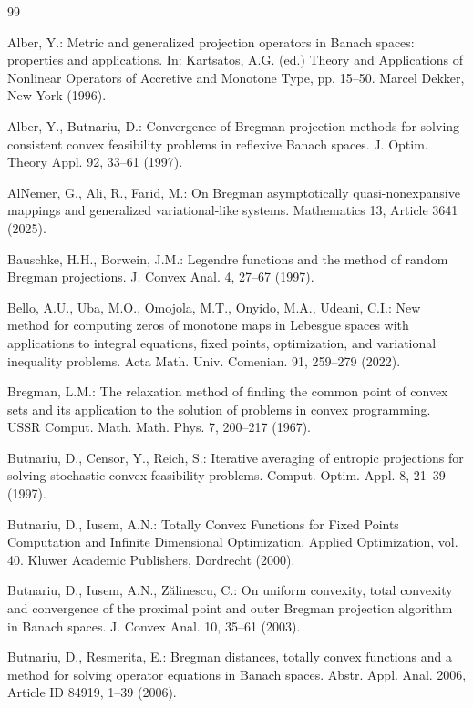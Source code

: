 \documentclass[leqno,12pt]{amsart}
\theoremstyle{definition}
\theoremstyle{remark}
\numberwithin{equation}{section}
\begin{document}
\begin{thebibliography}{99}

Alber, Y.: Metric and generalized projection operators in Banach spaces: properties and applications. In: Kartsatos, A.G. (ed.) Theory and Applications of Nonlinear Operators of Accretive and Monotone Type, pp. 15--50. Marcel Dekker, New York (1996).

Alber, Y., Butnariu, D.: Convergence of Bregman projection methods for solving consistent convex feasibility problems in reflexive Banach spaces. J. Optim. Theory Appl. 92, 33--61 (1997).

AlNemer, G., Ali, R., Farid, M.: On Bregman asymptotically quasi-nonexpansive mappings and generalized variational-like systems. Mathematics 13, Article 3641 (2025).

Bauschke, H.H., Borwein, J.M.: Legendre functions and the method of random Bregman projections. J. Convex Anal. 4, 27--67 (1997).

Bello, A.U., Uba, M.O., Omojola, M.T., Onyido, M.A., Udeani, C.I.: New method for computing zeros of monotone maps in Lebesgue spaces with applications to integral equations, fixed points, optimization, and variational inequality problems. Acta Math. Univ. Comenian. 91, 259--279 (2022).

Bregman, L.M.: The relaxation method of finding the common point of convex sets and its application to the solution of problems in convex programming. USSR Comput. Math. Math. Phys. 7, 200--217 (1967).

Butnariu, D., Censor, Y., Reich, S.: Iterative averaging of entropic projections for solving stochastic convex feasibility problems. Comput. Optim. Appl. 8, 21--39 (1997).

Butnariu, D., Iusem, A.N.: Totally Convex Functions for Fixed Points Computation and Infinite Dimensional Optimization. Applied Optimization, vol. 40. Kluwer Academic Publishers, Dordrecht (2000).

Butnariu, D., Iusem, A.N., Z\u{a}linescu, C.: On uniform convexity, total convexity and convergence of the proximal point and outer Bregman projection algorithm in Banach spaces. J. Convex Anal. 10, 35--61 (2003).

Butnariu, D., Resmerita, E.: Bregman distances, totally convex functions and a method for solving operator equations in Banach spaces. Abstr. Appl. Anal. 2006, Article ID 84919, 1--39 (2006).


\end{thebibliography}
\end{document}
